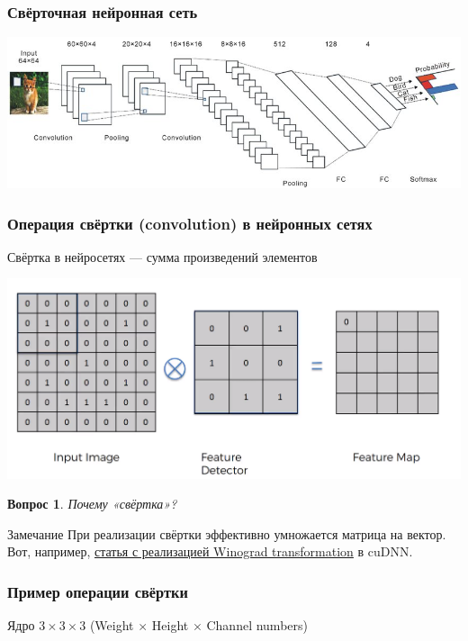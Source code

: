 \documentclass[fullscreen=true, bookmarks=true, hyperref={pdfencoding=unicode}]{beamer}
\newtheorem*{question}{Вопрос}
\begin{document}
\begin{frame}
  \frametitle{Свёрточная нейронная сеть}
  \begin{center}
    \includegraphics[keepaspectratio,
                     width=0.8\paperwidth]{cnn-example.png}
  \end{center}
\end{frame}


\begin{frame}
  \frametitle{Операция свёртки (convolution) в нейронных сетях}
  Свёртка в нейросетях — сумма произведений элементов
  \begin{center}
    \includegraphics[keepaspectratio,
                     width=0.8\paperwidth]{conv-example.png}
  \end{center}
\end{frame}


\begin{frame}
    \begin{question}
    Почему «свёртка»?
    \end{question}
    \pause
    \begin{alertblock}{Замечание}
    При реализации свёртки эффективно умножается матрица на вектор. Вот, например, \href{https://arxiv.org/pdf/1509.09308.pdf}{статья с реализацией Winograd transformation} в cuDNN.
    \end{alertblock}
\end{frame}


\begin{frame}
  \frametitle{Пример операции свёртки}
  Ядро $3\times3\times3$ (Weight $\times$ Height $\times$ Channel numbers)
  \begin{center}
  \end{center}
\end{frame}
\end{document}
